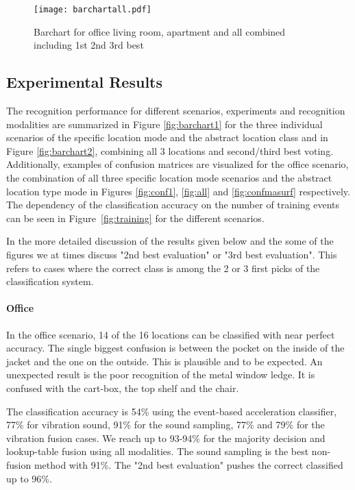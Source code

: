 \begin{figure}[t]
\centering  
\texttt{[image: barchartall.pdf]}
\caption[Classification performance over all]{Barchart for office living room, apartment and all combined
 including 1st 2nd 3rd best} \label{fig:barchart3} \end{figure} 



\subsection{Experimental Results} \label{sec:results}

The recognition performance for different scenarios, experiments and 
recognition modalities are summarized in
Figure \ref{fig:barchart1} for the three individual scenarios of
the specific location mode and the abstract location class and
in Figure \ref{fig:barchart2}, combining all 3 locations and second/third best voting.
Additionally, examples of confusion matrices are visualized for the
office scenario, the combination of all three specific location mode
scenarios and the abstract location type mode in Figures
\ref{fig:conf1}, \ref{fig:all} and \ref{fig:confmasurf} respectively.
The dependency of the classification accuracy on the number of training events can be seen 
in Figure~\ref{fig:training} for the different scenarios.

In the more detailed discussion of the results given below and the
some of the figures we at times discuss "2nd best evaluation" or "3rd
best evaluation". This refers to cases where the correct class
is among the 2 or 3 first picks of the classification system. 



\paragraph{Office}
In the office scenario, 14 of the 16 locations can be classified with
near perfect accuracy. The single biggest confusion is between the
pocket on the inside of the jacket and the one on the outside. This
is plausible and to be expected. An unexpected result is the poor
recognition of the metal window ledge. It is confused with the
cart-box, the top shelf and the chair. 

The classification accuracy is 54\% using the event-based acceleration
classifier, 77\% for vibration sound, 91\% for the sound sampling,
77\% and 79\% for the vibration fusion cases. We reach up to 93-94\%
for the majority decision and lookup-table fusion using all
modalities. The sound sampling is the best non-fusion method with
91\%. The "2nd best evaluation" pushes the correct classified up to
96\%.

